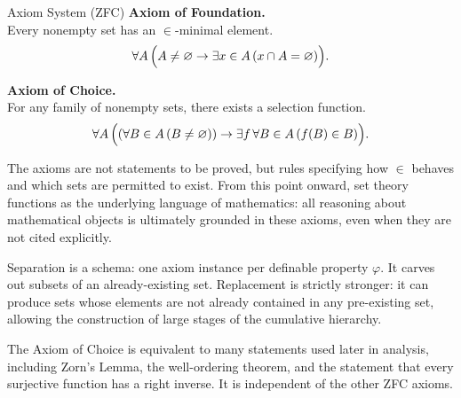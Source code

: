 \begin{axiombox}{Axiom System (ZFC)}
\medskip
\textbf{Axiom of Foundation.}\label{ax:foundation}\\
Every nonempty set has an $\in$-minimal element.
\[
\forall A \,
\Bigl( A \neq \varnothing \rightarrow
\exists x \in A \, (x \cap A = \varnothing) \Bigr).
\]

\medskip
\textbf{Axiom of Choice.}\label{ax:choice}\\
For any family of nonempty sets, there exists a selection function.
\[
\forall A \,
\Bigl(
(\forall B \in A \, (B \neq \varnothing))
\rightarrow
\exists f \,
\forall B \in A \, (f(B) \in B)
\Bigr).
\]
\end{axiombox}

\begin{remark*}
The axioms are not statements to be proved, but rules specifying how $\in$
behaves and which sets are permitted to exist. From this point onward, set
theory functions as the underlying language of mathematics: all reasoning
about mathematical objects is ultimately grounded in these axioms, even when
they are not cited explicitly.
\end{remark*}

\begin{remark*}
Separation is a schema: one axiom instance per definable property $\varphi$.
It carves out subsets of an already-existing set. Replacement is strictly
stronger: it can produce sets whose elements are not already contained in any
pre-existing set, allowing the construction of large stages of the cumulative
hierarchy.
\end{remark*}

\begin{remark*}
The Axiom of Choice is equivalent to many statements used later in analysis,
including Zorn's Lemma, the well-ordering theorem, and the statement that every
surjective function has a right inverse. It is independent of the other ZFC
axioms.
\end{remark*}
